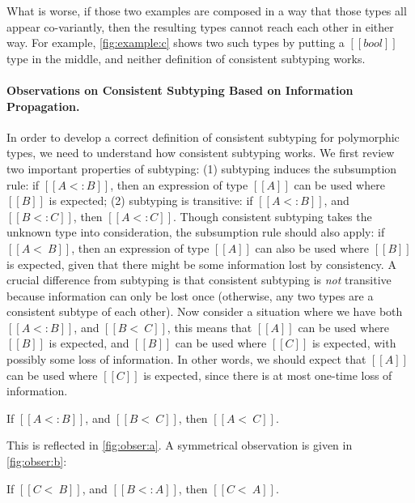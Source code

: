 What is worse, if those two examples are composed in a way that those types all
appear co-variantly, then the resulting types cannot reach each other
in either
way. For example, \cref{fig:example:c} shows two such types by putting a
$[[bool]]$ type in the middle, and neither definition of consistent subtyping
works. %

\paragraph{Observations on Consistent Subtyping Based on Information Propagation.}

In order to develop a correct definition of consistent subtyping for
polymorphic types, we need to understand how consistent subtyping works.
We first review two important properties of subtyping: (1) subtyping induces the
subsumption rule: if $[[ A <: B  ]]$, then an expression of type $[[A]]$ can be used
where $[[B]]$ is expected; (2) subtyping is transitive: if $[[ A <: B ]]$, and $[[B <: C]]$,
then $[[A <: C]]$. Though consistent subtyping takes the unknown type into
consideration, the subsumption rule should also apply: if $[[ A <~ B ]]$, then
an expression of type $[[A]]$ can also be used where $[[B]]$ is expected, given that
there might be some information lost by consistency. A crucial difference from
subtyping is that consistent subtyping is \emph{not} transitive because
information can only be lost once (otherwise, any two types are a consistent
subtype of each other). Now consider a situation where we have both $[[ A <: B ]]$,
and $[[ B <~ C ]]$, this means that $[[A]]$ can be used where $[[B]]$ is expected, and
$[[B]]$ can be used where $[[C]]$ is expected, with possibly some loss of information. In
other words, we should expect that $[[A]]$ can be used where $[[C]]$ is expected, since
there is at most one-time loss of information.

\begin{observation}
  If $[[A <: B]]$, and $[[B <~ C]]$, then $[[A <~ C]]$.
\end{observation}

This is reflected in \cref{fig:obser:a}. A symmetrical
observation is given in \cref{fig:obser:b}:


\begin{observation}
  If $[[C <~ B]]$, and $[[B <: A]]$, then $[[C <~ A]]$.
\end{observation}

